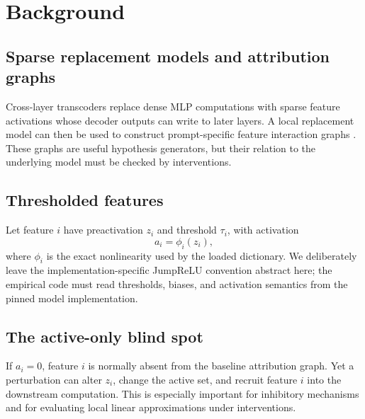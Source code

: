 \section{Background}
\label{sec:background}

\subsection{Sparse replacement models and attribution graphs}

Cross-layer transcoders replace dense MLP computations with sparse feature activations whose decoder outputs can write to later layers. A local replacement model can then be used to construct prompt-specific feature interaction graphs \citep{ameisen2025circuit}. These graphs are useful hypothesis generators, but their relation to the underlying model must be checked by interventions.

\subsection{Thresholded features}

Let feature $i$ have preactivation $z_i$ and threshold $\tau_i$, with activation
\begin{equation}
    a_i=\phi_i(z_i),
\end{equation}
where $\phi_i$ is the exact nonlinearity used by the loaded dictionary. We deliberately leave the implementation-specific JumpReLU convention abstract here; the empirical code must read thresholds, biases, and activation semantics from the pinned model implementation.

\subsection{The active-only blind spot}

If $a_i=0$, feature $i$ is normally absent from the baseline attribution graph. Yet a perturbation can alter $z_i$, change the active set, and recruit feature $i$ into the downstream computation. This is especially important for inhibitory mechanisms and for evaluating local linear approximations under interventions.
